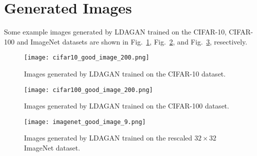 \documentclass{article}
\def\ie{\emph{i.e.}}
\begin{document}
\begin{figure*}
  \centering
    \hspace{.2in}
    \hspace{.2in}
     \caption{Images (with size $32\times32$) generated by different generators of LDAGAN at different epochs. Each row corresponds to one generator (\ie~mode). The model is trained on ImageNet. }
     \label{fig:TrainPro3}
\end{figure*}
\section{Generated Images}
\label{App:GenImg}

Some example images generated by LDAGAN trained on the CIFAR-10, CIFAR-100 and ImageNet datasets are shown in Fig.~\ref{fig:ExpImg1}, Fig.~\ref{fig:ExpImg2}, and Fig.~\ref{fig:ExampImg3}, resectively.
\begin{figure}[h]
  \centering
    \texttt{[image: cifar10\_good\_image\_200.png]}
     \caption{Images generated by LDAGAN trained on the CIFAR-10 dataset.}
     \label{fig:ExpImg1}
\end{figure}

\begin{figure}[h]
  \centering
    \texttt{[image: cifar100\_good\_image\_200.png]}
     \caption{Images generated by LDAGAN trained on the CIFAR-100 dataset.}
     \label{fig:ExpImg2}
\end{figure}

\begin{figure}[h]
  \centering
    \texttt{[image: imagenet\_good\_image\_9.png]}
     \caption{Images generated by LDAGAN trained on the rescaled $32\times32$ ImageNet dataset.}
     \label{fig:ExampImg3}
\end{figure}
\end{document}
